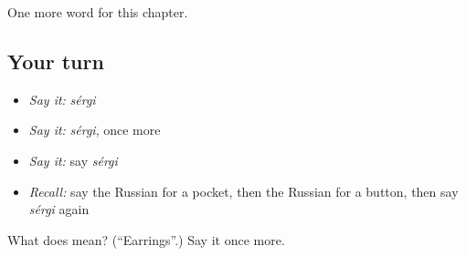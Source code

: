 \begin{grammarlens}[title={What you've built}]
One more word for this chapter.
\end{grammarlens}

\subsection*{Your turn}
\begin{itemize}
\raggedright
  \item \emph{Say it:} \emph{sérgi}
  \item \emph{Say it:} \emph{sérgi}, once more
  \item \emph{Say it:} say \emph{sérgi}
  \item \emph{Recall:} say the Russian for a pocket, then the Russian for a button, then say \emph{sérgi} again
\end{itemize}

\begin{tcolorbox}[breakable,colback=teal!4,colframe=teal!35!black,title={Before you move on}]
What does  mean? (\textquotedblleft{}Earrings\textquotedblright{}.) Say it once more.
\end{tcolorbox}
